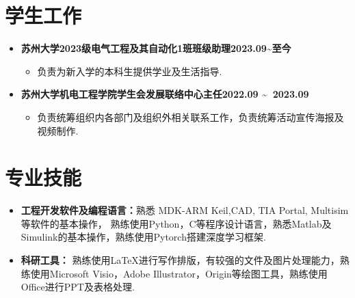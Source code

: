 \documentclass[UTF8,AutoFakeBold]{resume}
\begin{document}
\vspace{0.1em}
\section{\hspace{0.25em}\makebox[0.75em][c]{\faPaperPlane}\hspace{0.25em} \fangsong\textbf{学生工作}}
\begin{itemize}
    \sloppy{}
    \item 
    {\large\kaishu\textbf{苏州大学2023级电气工程及其自动化1班班级助理\hspace{5.4cm}2023.09\textasciitilde 至今}}

    \begin{itemize}
        \item[\faThumbTack]  \kaishu 负责为新入学的本科生提供学业及生活指导.
    \end{itemize}

    \item
    {\large\kaishu\textbf{苏州大学机电工程学院学生会发展联络中心主任\hspace{5.4cm}2022.09 \textasciitilde \ 2023.09}}

    \begin{itemize}
        \item[\faThumbTack]  \kaishu 负责统筹组织内各部门及组织外相关联系工作，负责统筹活动宣传海报及视频制作.
    \end{itemize}
\end{itemize}

\vspace{0.1em}
\section{\hspace{0.25em}\makebox[0.75em][c]{\faPuzzlePiece}\hspace{0.25em} \fangsong\textbf{专业技能}}
\begin{itemize}
    \item \kaishu \textbf{工程开发软件及编程语言：}熟悉 MDK-ARM Keil,CAD, TIA Portal, Multisim 等软件的基本操作， 熟练使用Python，C等程序设计语言，熟悉Matlab及Simulink的基本操作，熟练使用Pytorch搭建深度学习框架.
    \item \kaishu \textbf{科研工具：} 熟练使用\LaTeX 进行写作排版，有较强的文件及图片处理能力，熟练使用Microsoft Visio，Adobe Illustrator，Origin等绘图工具，熟练使用Office进行PPT及表格处理.
\end{itemize}
\end{document}
